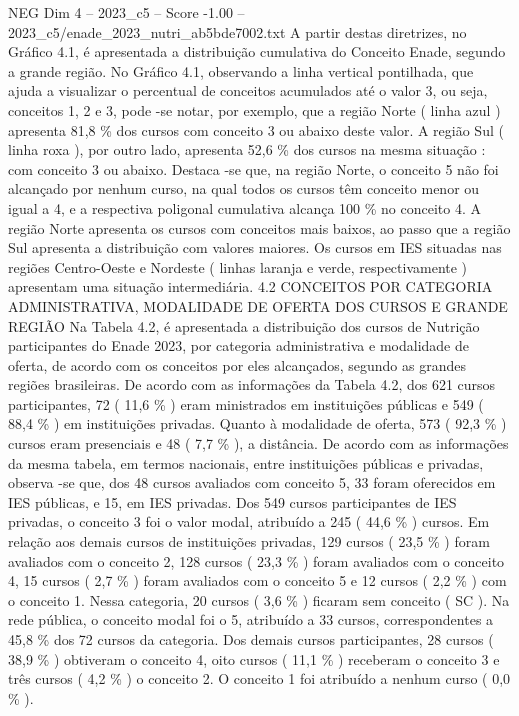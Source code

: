 \begin{textsample}{NEG Dim 4 – 2023\_c5 – Score -1.00 – 2023\_c5/enade\_2023\_nutri\_ab5bde7002.txt}
A partir destas diretrizes, no Gráfico 4.1, é apresentada a distribuição cumulativa do Conceito Enade, segundo a grande região.
No Gráfico 4.1, observando a linha vertical pontilhada, que ajuda a visualizar o percentual de conceitos acumulados até o valor 3, ou seja, conceitos 1, 2 e 3, pode -se notar, por exemplo, que a região Norte ( linha azul ) apresenta 81,8 \% dos cursos com conceito 3 ou abaixo deste valor.
A região Sul ( linha roxa ), por outro lado, apresenta 52,6 \% dos cursos na mesma situação : com conceito 3 ou abaixo.
Destaca -se que, na região Norte, o conceito 5 não foi alcançado por nenhum curso, na qual todos os cursos têm conceito menor ou igual a 4, e a respectiva poligonal cumulativa alcança 100 \% no conceito 4.
A região Norte apresenta os cursos com conceitos mais baixos, ao passo que a região Sul apresenta a distribuição com valores maiores.
Os cursos em IES situadas nas regiões Centro-Oeste e Nordeste ( linhas laranja e verde, respectivamente ) apresentam uma situação intermediária. 4.2 CONCEITOS POR CATEGORIA ADMINISTRATIVA, MODALIDADE DE OFERTA DOS CURSOS E GRANDE REGIÃO Na Tabela 4.2, é apresentada a distribuição dos cursos de Nutrição participantes do Enade 2023, por categoria administrativa e modalidade de oferta, de acordo com os conceitos por eles alcançados, segundo as grandes regiões brasileiras.
De acordo com as informações da Tabela 4.2, dos 621 cursos participantes, 72 ( 11,6 \% ) eram ministrados em instituições públicas e 549 ( 88,4 \% ) em instituições privadas.
Quanto à modalidade de oferta, 573 ( 92,3 \% ) cursos eram presenciais e 48 ( 7,7 \% ), a distância.
De acordo com as informações da mesma tabela, em termos nacionais, entre instituições públicas e privadas, observa -se que, dos 48 cursos avaliados com conceito 5, 33 foram oferecidos em IES públicas, e 15, em IES privadas.
Dos 549 cursos participantes de IES privadas, o conceito 3 foi o valor modal, atribuído a 245 ( 44,6 \% ) cursos.
Em relação aos demais cursos de instituições privadas, 129 cursos ( 23,5 \% ) foram avaliados com o conceito 2, 128 cursos ( 23,3 \% ) foram avaliados com o conceito 4, 15 cursos ( 2,7 \% ) foram avaliados com o conceito 5 e 12 cursos ( 2,2 \% ) com o conceito 1.
Nessa categoria, 20 cursos ( 3,6 \% ) ficaram sem conceito ( SC ).
Na rede pública, o conceito modal foi o 5, atribuído a 33 cursos, correspondentes a 45,8 \% dos 72 cursos da categoria.
Dos demais cursos participantes, 28 cursos ( 38,9 \% ) obtiveram o conceito 4, oito cursos ( 11,1 \% ) receberam o conceito 3 e três cursos ( 4,2 \% ) o conceito 2.
O conceito 1 foi atribuído a nenhum curso ( 0,0 \% ).

\end{textsample}
